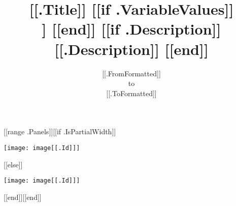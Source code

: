 \documentclass{article}
\begin{document}
\pagestyle{edbheader}
\title{ \vspace{30mm} \sffamily \Huge [[.Title]] [[if .VariableValues]] \\ [[.VariableValues]] [[end]] [[if .Description]] \\
\vspace{0.5cm} \rmfamily \Large [[.Description]] [[end]]}
\date{[[.FromFormatted]]\vspace{0.25cm}\\to\\\vspace{0.25cm}[[.ToFormatted]]}
\maketitle
\newpage
\begin{center}
[[range .Panels]][[if .IsPartialWidth]]\begin{minipage}{[[.Width]]\textwidth}
\texttt{[image: image[[.Id]]]}
\end{minipage}
[[else]]\par
\vspace{0.5cm}
\texttt{[image: image[[.Id]]]}
\par
\vspace{0.5cm}
[[end]][[end]]
\end{center}
\end{document}
